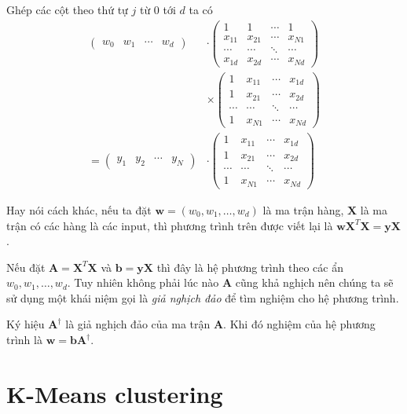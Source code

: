 Ghép các cột theo thứ tự $j$ từ 0 tới $d$ ta có
\begin{align*}
    \begin{pmatrix}
        w_0 & w_1 & \cdots & w_d
    \end{pmatrix} & \cdot \begin{pmatrix}
        1 & 1 & \cdots & 1 \\ x_{11} & x_{21} & \cdots & x_{N1} \\ \cdots & \cdots & \ddots & \cdots \\ x_{1d} & x_{2d} & \cdots & x_{Nd}
    \end{pmatrix} \\ & \times \begin{pmatrix}
        1 & x_{11} & \cdots & x_{1d} \\ 1 & x_{21} & \cdots & x_{2d} \\ \cdots & \cdots & \ddots & \cdots \\ 1 & x_{N1} & \cdots & x_{Nd}
    \end{pmatrix} \\ = \begin{pmatrix}
        y_1 & y_2 & \cdots & y_N
    \end{pmatrix} & \cdot \begin{pmatrix}
        1 & x_{11} & \cdots & x_{1d} \\ 1 & x_{21} & \cdots & x_{2d} \\ \cdots & \cdots & \ddots & \cdots \\ 1 & x_{N1} & \cdots & x_{Nd}
    \end{pmatrix}
\end{align*}

Hay nói cách khác, nếu ta đặt $\bm{w} = (w_0, w_1, \ldots, w_d)$ là ma trận hàng, $\bm{X}$ là ma trận có các hàng là các input, thì phương trình trên được viết lại là $\bm{w} \bm{X}^T \bm{X} = \bm{y} \bm{X}$.

Nếu đặt $\bm{A} = \bm{X}^T \bm{X}$ và $\bm{b} = \bm{y} \bm{X}$ thì đây là hệ phương trình theo các ẩn $w_0, w_1, \ldots, w_d$. Tuy nhiên không phải lúc nào $\bm{A}$ cũng khả nghịch nên chúng ta sẽ sử dụng một khái niệm gọi là \textit{giả nghịch đảo} để tìm nghiệm cho hệ phương trình.

Ký hiệu $\bm{A}^\dag$ là giả nghịch đảo của ma trận $\bm{A}$. Khi đó nghiệm của hệ phương trình là $\bm{w} = \bm{b} \bm{A}^\dag$.

\section*{K-Means clustering}

